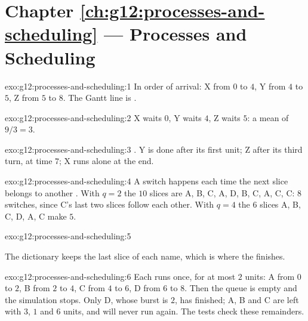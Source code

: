 \section*{Chapter \ref{ch:g12:processes-and-scheduling} --- Processes and Scheduling}

\begin{solution}{exo:g12:processes-and-scheduling:1}
In order of arrival: X from $0$ to $4$, Y from $4$ to $5$, Z from $5$ to $8$. The Gantt line is .
\end{solution}

\begin{solution}{exo:g12:processes-and-scheduling:2}
X waits $0$, Y waits $4$, Z waits $5$: a mean of $9/3 = 3$.
\end{solution}

\begin{solution}{exo:g12:processes-and-scheduling:3}
. Y is done after its first unit; Z after its third turn, at time $7$; X runs alone at the end.
\end{solution}

\begin{solution}{exo:g12:processes-and-scheduling:4}
A switch happens each time the next slice belongs to another . With $q = 2$ the $10$ slices are A, B, C, A, D,
B, C, A, C, C: $8$ switches, since C's last two slices follow each other. With $q = 4$ the $6$ slices A, B, C, D, A, C
make $5$.
\end{solution}

\begin{solution}{exo:g12:processes-and-scheduling:5}
\smallskip\noindent\hspace*{2em}

\noindent\hspace*{4em}

\noindent\hspace*{4em}

\smallskip\noindent The dictionary keeps the last slice of each name, which is where the  finishes.
\end{solution}

\begin{solution}{exo:g12:processes-and-scheduling:6}
Each  runs once, for at most $2$ units: A from $0$ to $2$, B from $2$ to $4$, C from $4$ to $6$, D from $6$ to
$8$. Then the queue is empty and the simulation stops. Only D, whose burst is $2$, has finished; A, B and C are left
with $3$, $1$ and $6$ units, and will never run again. The tests check these remainders.
\end{solution}

